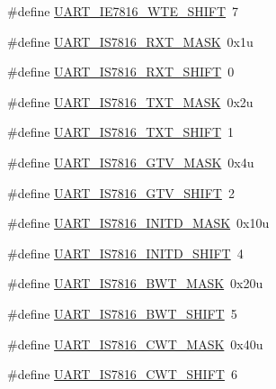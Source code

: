 \begin{DoxyCompactItemize}
\item 
\#define \hyperlink{group___u_a_r_t___register___masks_ga6e2ca36b5cad7ae3a90b5ae5d54ca3f3}{U\+A\+R\+T\+\_\+\+I\+E7816\+\_\+\+W\+T\+E\+\_\+\+S\+H\+I\+FT}~7
\item 
\#define \hyperlink{group___u_a_r_t___register___masks_ga70556c9c160817cdae5da7b0e96d755e}{U\+A\+R\+T\+\_\+\+I\+S7816\+\_\+\+R\+X\+T\+\_\+\+M\+A\+SK}~0x1u
\item 
\#define \hyperlink{group___u_a_r_t___register___masks_ga189a4242177b8a2ebe2cd216a1fdfb41}{U\+A\+R\+T\+\_\+\+I\+S7816\+\_\+\+R\+X\+T\+\_\+\+S\+H\+I\+FT}~0
\item 
\#define \hyperlink{group___u_a_r_t___register___masks_gae05e13012c95c5f0ebc11ec8a0d474c6}{U\+A\+R\+T\+\_\+\+I\+S7816\+\_\+\+T\+X\+T\+\_\+\+M\+A\+SK}~0x2u
\item 
\#define \hyperlink{group___u_a_r_t___register___masks_ga460ed2c07230c4c0de6ae3701a1f84f1}{U\+A\+R\+T\+\_\+\+I\+S7816\+\_\+\+T\+X\+T\+\_\+\+S\+H\+I\+FT}~1
\item 
\#define \hyperlink{group___u_a_r_t___register___masks_ga863b3dbfbf807a29466c8acf12054673}{U\+A\+R\+T\+\_\+\+I\+S7816\+\_\+\+G\+T\+V\+\_\+\+M\+A\+SK}~0x4u
\item 
\#define \hyperlink{group___u_a_r_t___register___masks_ga522eab69113bfd36e6f58835baa045a8}{U\+A\+R\+T\+\_\+\+I\+S7816\+\_\+\+G\+T\+V\+\_\+\+S\+H\+I\+FT}~2
\item 
\#define \hyperlink{group___u_a_r_t___register___masks_ga48d3ed5c444bdfed8d0baa49bd44d1c2}{U\+A\+R\+T\+\_\+\+I\+S7816\+\_\+\+I\+N\+I\+T\+D\+\_\+\+M\+A\+SK}~0x10u
\item 
\#define \hyperlink{group___u_a_r_t___register___masks_gaf36d718f5eb5c052b7670168d8b429b1}{U\+A\+R\+T\+\_\+\+I\+S7816\+\_\+\+I\+N\+I\+T\+D\+\_\+\+S\+H\+I\+FT}~4
\item 
\#define \hyperlink{group___u_a_r_t___register___masks_gab2edbcc850e211bdeadca83910170e5a}{U\+A\+R\+T\+\_\+\+I\+S7816\+\_\+\+B\+W\+T\+\_\+\+M\+A\+SK}~0x20u
\item 
\#define \hyperlink{group___u_a_r_t___register___masks_gab670b08a2ab5d4631892ca58eb447284}{U\+A\+R\+T\+\_\+\+I\+S7816\+\_\+\+B\+W\+T\+\_\+\+S\+H\+I\+FT}~5
\item 
\#define \hyperlink{group___u_a_r_t___register___masks_gae20bf90aa36595094749fe075ce5cf0e}{U\+A\+R\+T\+\_\+\+I\+S7816\+\_\+\+C\+W\+T\+\_\+\+M\+A\+SK}~0x40u
\item 
\#define \hyperlink{group___u_a_r_t___register___masks_gad6a4add4b3460d31343487ae64ee43c9}{U\+A\+R\+T\+\_\+\+I\+S7816\+\_\+\+C\+W\+T\+\_\+\+S\+H\+I\+FT}~6

\end{DoxyCompactItemize}
